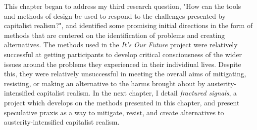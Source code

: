 This chapter began to address my third research question, "How can the tools and methods of design be used to respond to the challenges presented by capitalist realism?", and identified some promising initial directions in the form of methods that are centered on the identification of problems and creating alternatives. The methods used in the \textit{It's Our Future} project were relatively successful at getting participants to develop critical consciousness of the wider issues around the problems they experienced in their individiual lives. Despite this, they were relatively unsuccessful in meeting the overall aims of mitigating, resisting, or making an alternative to the harms brought about by austerity-intensified capitalist realism. In the next chapter, I detail \textit{fractured signals}, a project which develops on the methods presented in this chapter, and present speculative praxis as a way to mitigate, resist, and create alternatives to austerity-intensified capitalist realism. 